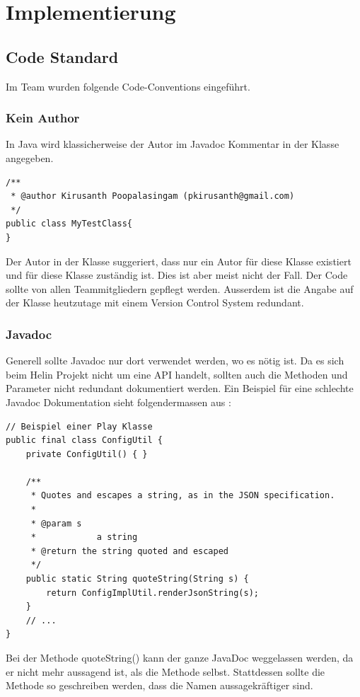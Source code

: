 \section{Implementierung}

\subsection{Code Standard}
Im Team wurden folgende Code-Conventions eingeführt.

\subsubsection{Kein Author}
In Java wird klassicherweise der Autor im Javadoc Kommentar in der Klasse angegeben.

\begin{lstlisting}
/**
 * @author Kirusanth Poopalasingam (pkirusanth@gmail.com)
 */
public class MyTestClass{
}
\end{lstlisting}

Der Autor in der Klasse suggeriert, dass nur ein Autor für diese Klasse existiert und für diese Klasse zuständig ist. Dies ist aber meist nicht der Fall. 
Der Code sollte von allen Teammitgliedern gepflegt werden. Ausserdem ist die Angabe auf der Klasse heutzutage mit einem Version Control System redundant.

\subsubsection{Javadoc}
Generell sollte Javadoc nur dort verwendet werden, wo es nötig ist. Da es sich beim Helin Projekt nicht um eine API handelt, sollten auch die Methoden und Parameter nicht redundant dokumentiert werden. Ein Beispiel für eine schlechte Javadoc Dokumentation sieht folgendermassen aus :

\begin{lstlisting}
// Beispiel einer Play Klasse
public final class ConfigUtil {
    private ConfigUtil() { }

    /**
     * Quotes and escapes a string, as in the JSON specification.
     *
     * @param s
     *            a string
     * @return the string quoted and escaped
     */
    public static String quoteString(String s) {
        return ConfigImplUtil.renderJsonString(s);
    }
    // ...
}
\end{lstlisting}

Bei der Methode quoteString() kann der ganze JavaDoc weggelassen werden, da er nicht mehr aussagend ist, als die Methode selbst.
Stattdessen sollte die Methode so geschreiben werden, dass die Namen aussagekräftiger sind.

